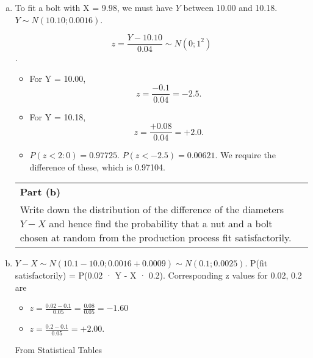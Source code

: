 \documentclass[a4paper,12pt]{article}
\begin{document}
\begin{enumerate}[(a)]
\item To fit a bolt with X = 9.98, we must have $Y$ between 10.00 and 10.18.
$Y \sim N(10.10; 0.0016)$. 

\[z = \frac{Y -10.10}{0.04} \sim N(0; 1^2)\].
\begin{itemize}
    \item For Y = 10.00, \[z = \frac{-0.1}{0.04} = -2.5.\]
\item For Y = 10.18, \[z = \frac{+0.08}{0.04} = +2.0.\]

\item $P(z < 2:0) = 0.97725$. $P(z < -2.5) = 0.00621$.
We require the difference of these, which is 0.97104.
\end{itemize}
\newpage
  \begin{table}[ht!]
     \centering
     \begin{tabular}{|p{15cm}|}
     \hline  
\noindent \textbf{Part (b)}\\Write down the distribution of the difference of the diameters $Y - X$ and hence find the probability that a nut and a bolt chosen at random from the production process fit satisfactorily.
\\ \hline
      \end{tabular}
    \end{table}
    
\item  $Y - X \sim N(10.1 - 10.0; 0.0016 + 0.0009) \sim N(0.1; 0.0025).$
P(fit satisfactorily) = P(0.02 · Y - X · 0.2). Corresponding z values for
0.02, 0.2 are 
\begin{itemize}
\item $z = \frac{0.02-0.1}{0.05} = \frac{0.08}{0.05} = -1.60$ 

\item $z = \frac{0.2-0.1}{0.05} = +2.00.$
\end{itemize}
From Statistical Tables


\end{enumerate}
\end{document}
